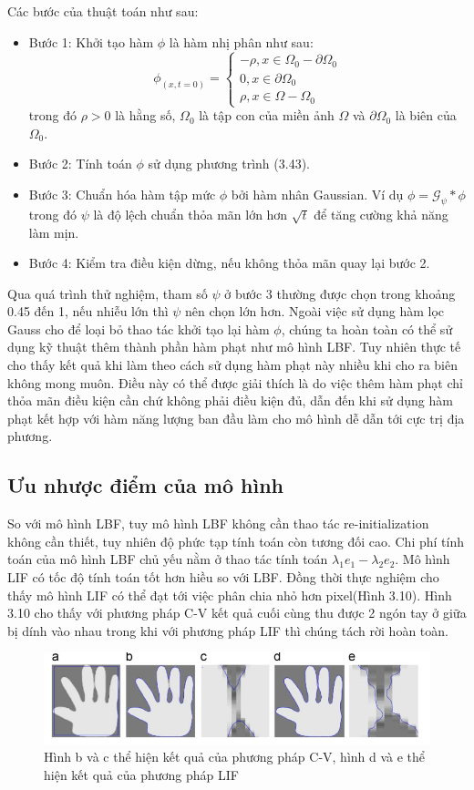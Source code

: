 \documentclass[12pt, oneside, a4paper]{book}
\newcommand{\G}{\mathcal G}
\begin{document}
Các bước của thuật toán như sau:
\begin{itemize}
\item Bước 1: Khởi tạo hàm $\phi$ là hàm nhị phân như sau:
\begin{equation*}
\phi_(x,t=0)=\begin{cases}
-\rho, x\in \Omega_0 -\partial \Omega_0\\
0, x\in \partial \Omega_0\\
\rho, x\in \Omega- \Omega_0
\end{cases}
\end{equation*}
 trong đó $\rho>0$ là hằng số, $\Omega_0$ là tập con  của miền ảnh $\Omega$ và $\partial \Omega_0$ là biên của $\Omega_0$.
 \item Bước 2: Tính toán $\phi$ sử dụng phương trình (3.43).
 \item Bước 3: Chuẩn hóa hàm tập mức $\phi$ bởi hàm nhân Gaussian. Ví dụ $\phi=\G_{\psi}*\phi$ trong đó $\psi$ là độ lệch chuẩn thỏa mãn lớn hơn $\sqrt{t}$ để tăng cường khả năng làm mịn.
 \item Bước 4: Kiểm tra điều kiện dừng, nếu không thỏa mãn quay lại bước 2.
\end{itemize}
Qua quá trình thử nghiệm, tham số $\psi$ ở bước 3 thường được chọn trong khoảng 0.45 đến 1, nếu nhiễu lớn thì $\psi$ nên chọn lớn hơn.
Ngoài việc sử dụng hàm lọc Gauss cho để loại bỏ thao tác khởi tạo lại hàm $\phi$, chúng ta hoàn toàn có thể sử dụng kỹ thuật thêm thành phần hàm phạt như mô hình LBF. Tuy nhiên thực tế cho thấy kết quả khi làm theo cách sử dụng hàm phạt này nhiều khi cho ra biên không mong muôn. Điều này có thể được giải thích là do việc thêm hàm phạt chỉ thỏa mãn điều kiện cần chứ không phải điều kiện đủ, dẫn đến khi sử dụng hàm phạt kết hợp với hàm năng lượng ban đầu làm cho mô hình dễ dẫn tới cực trị địa phương.
\subsection{Ưu nhược điểm của mô hình}
So với mô hình LBF, tuy mô hình LBF không cần thao tác re-initialization không cần thiết, tuy nhiên độ phức tạp tính toán còn tương đối cao. Chi phí tính toán của mô hình LBF chủ yếu nằm ở thao tác tính toán $\lambda_1 e_1-\lambda_2 e_2$. Mô hình LIF có tốc độ tính toán tốt hơn hiều so với LBF. Đồng thời thực nghiệm cho thấy mô hình LIF có thể đạt tới việc phân chia nhỏ hơn pixel(Hình 3.10). Hình 3.10 cho thấy với phương pháp C-V kết quả cuối cùng thu được 2 ngón tay ở giữa bị dính vào nhau trong khi với phương pháp LIF thì chúng tách rời hoàn toàn.
\begin{center}
\begin{figure}
\includegraphics[scale=0.7]{figure/subpixel.png}
\caption{Hình b và c thể hiện kết quả của phương pháp C-V, hình  d và e thể hiện kết quả của phương pháp LIF}
\end{figure}

\end{center}   
\end{document}

